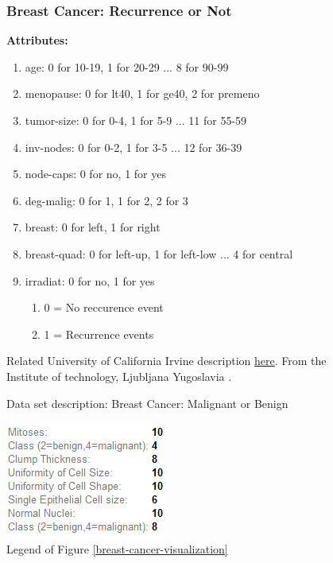 \documentclass[a4paper,12pt, oneside]{memoir}
\begin{document}
\begin{figure}[h]
  \centering
  \begin{minipage}[h]{1.0\textwidth}
    \subsubsection{Breast Cancer: Recurrence or Not}
    \textbf{Attributes:}
      \begin{enumerate}
        \setlength\itemsep{0.001em}
        \item age: 0 for 10-19, 1 for 20-29 ... 8 for 90-99
        \item menopause: 0 for lt40, 1 for ge40, 2 for premeno
        \item tumor-size: 0 for 0-4, 1 for 5-9 ... 11 for 55-59
        \item inv-nodes: 0 for 0-2, 1 for 3-5 ... 12 for 36-39
        \item node-caps: 0 for no, 1 for yes
        \item deg-malig: 0 for 1, 1 for 2, 2 for 3
        \item breast: 0 for left, 1 for right
        \item breast-quad: 0 for left-up, 1 for left-low ... 4 for central
        \item irradiat: 0 for no, 1 for yes
          \begin{enumerate}
            \item 0 = No reccurence event
            \item 1 = Recurrence events
          \end{enumerate}
      \end{enumerate}

      Related University of California Irvine description \href{https://archive.ics.uci.edu/ml/datasets/Breast+Cancer}{here}. From the Institute of technology, Ljubljana Yugoslavia \cite{uci-machine-learning-repo-2013}.
  \end{minipage}
  \hfill
  \begin{minipage}[h]{0.0\textwidth}
  \end{minipage}
  \caption{Data set description: Breast Cancer: Malignant or Benign}
  \label{mammographic-mass-screaning-data set-description}
\end{figure}

\begin{figure}[!th]
  \centering
  \includegraphics[scale=1] {Breast_cancer_Wisconsin_Visualisation_legend}
  \caption {Legend of Figure \ref{breast-cancer-visualization}}
  \label {breast-cancer-visualization-legend}
\end{figure}
\end{document}
